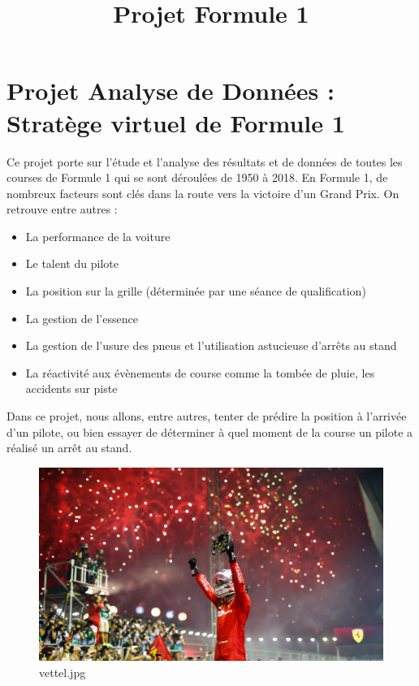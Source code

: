 \documentclass[11pt]{article}
\title{Projet Formule 1}
\begin{document}
    
    \maketitle
    
    

    
    \hypertarget{projet-analyse-de-donnuxe9es-stratuxe8ge-virtuel-de-formule-1}{%
\section{Projet Analyse de Données : Stratège virtuel de Formule
1}\label{projet-analyse-de-donnuxe9es-stratuxe8ge-virtuel-de-formule-1}}

Ce projet porte sur l'étude et l'analyse des résultats et de données de
toutes les courses de Formule 1 qui se sont déroulées de 1950 à 2018. En
Formule 1, de nombreux facteurs sont clés dans la route vers la victoire
d'un Grand Prix. On retrouve entre autres :

\begin{itemize}
\item La performance de la voiture

\item Le talent du pilote

\item La position sur la grille (déterminée par une séance de qualification)

\item La gestion de l'essence

\item La gestion de l'usure des pneus et l'utilisation astucieuse d'arrêts au
stand

\item La réactivité aux évènements de course comme la tombée de pluie, les
accidents sur piste
\end{itemize}


Dans ce projet, nous allons, entre autres, tenter de prédire la position
à l'arrivée d'un pilote, ou bien essayer de déterminer à quel moment de
la course un pilote a réalisé un arrêt au stand.

\begin{figure}
\centering
\includegraphics{vettel.jpg}
\caption{vettel.jpg}
\end{figure}
\end{document}
